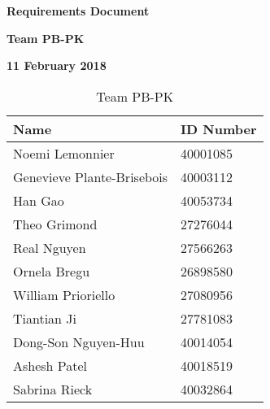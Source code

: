 \documentclass[12pt]{article}
\begin{document}
\pagestyle{plain}
\vspace*{0.5in}
\centerline{\bf\Large Requirements Document}

\vspace*{0.5in}
\centerline{\bf\Large Team PB-PK}

\vspace*{0.5in}
\centerline{\bf\Large 11 February 2018}

\vspace*{1.5in}
\begin{table}[ht]


\begin{center}
\begin{tabular}{|l | l |}
\hline
\textbf{Name} & \textbf{ID Number} \\

\hline Noemi Lemonnier & 40001085 \\ \hline Genevieve Plante-Brisebois & 40003112 \\ \hline Han Gao & 40053734 \\
\hline Theo	Grimond & 27276044 \\ \hline Real	Nguyen & 27566263 \\ \hline Ornela Bregu & 26898580 \\
\hline William	Prioriello & 27080956 \\ \hline Tiantian	Ji & 27781083 \\ \hline Dong-Son Nguyen-Huu & 40014054  \\
\hline Ashesh Patel & 40018519 \\ \hline Sabrina	Rieck & 40032864 \\

\hline
\end{tabular}
\end{center}
\caption{Team PB-PK}
\end{table}

\clearpage
\end{document}
